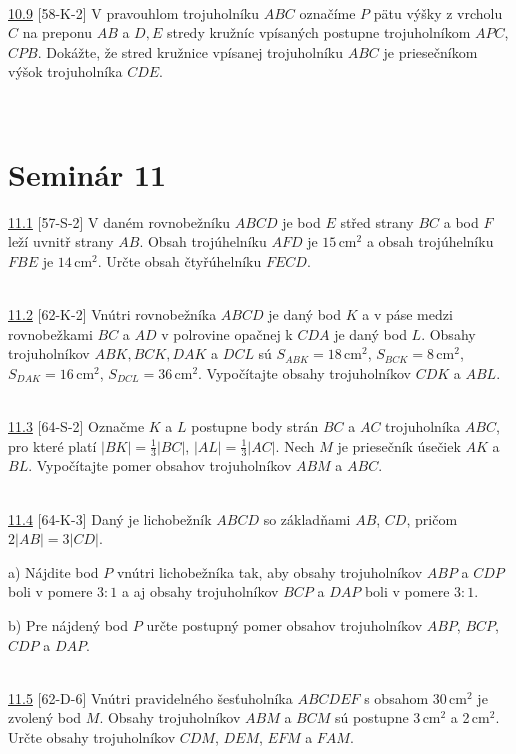\\

\noindent \ul{10.9} [58-K-2]
V pravouhlom trojuholníku $ABC$ označíme $P$ pätu výšky z vrcholu $C$ na preponu $AB$ a $D, E$ stredy kružníc vpísaných postupne trojuholníkom $APC$, $CPB$. Dokážte, že stred
kružnice vpísanej trojuholníku $ABC$ je priesečníkom výšok trojuholníka $CDE$.


\\

\section*{Seminár 11}

\noindent \ul{11.1} [57-S-2] V daném rovnobežníku $ABCD$ je bod $E$ střed strany $BC$ a bod $F$ leží
uvnitř strany $AB$. Obsah trojúhelníku $AFD$ je $15$\,cm$^2$ a obsah trojúhelníku $FBE$ je
$14$\,cm$^2$. Určte obsah čtyřúhelníku $FECD$.


\\

\noindent \ul{11.2} [62-K-2] Vnútri rovnobežníka $ABCD$ je daný bod $K$ a v páse medzi rovnobežkami $BC$ a $AD$ v polrovine opačnej k $CDA$ je daný bod $L$. Obsahy trojuholníkov $ABK, BCK, DAK$ a $DCL$ sú $S_{ABK} = 18$\,cm$^2$, $S_{BCK} = 8$\,cm$^2$, $S_{DAK} = 16$\,cm$^2$, $S_{DCL} = 36$\,cm$^2$. Vypočítajte obsahy trojuholníkov $CDK$ a $ABL$.


\\

\noindent \ul{11.3} [64-S-2] Označme $K$ a $L$ postupne body strán $BC$ a $AC$ trojuholníka $ABC$, pro které platí $|BK|= \frac{1}{3}|BC|$, $|AL| =\frac{1}{3}|AC|$. Nech $M$ je priesečník úsečiek $AK$ a $BL$. Vypočítajte pomer obsahov trojuholníkov $ABM$ a $ABC$.


\\

\noindent \ul{11.4} [64-K-3]  Daný je lichobežník $ABCD$ so základňami $AB$, $CD$, pričom $2|AB| = 3|CD|$.

a) Nájdite bod $P$ vnútri lichobežníka tak, aby obsahy trojuholníkov $ABP$ a $CDP$ boli v pomere $3 : 1$ a aj obsahy trojuholníkov $BCP$ a $DAP$ boli v pomere $3 : 1$.

b) Pre nájdený bod $P$ určte postupný pomer obsahov trojuholníkov $ABP$, $BCP$, $CDP$ a $DAP$.


\\

\noindent \ul{11.5} [62-D-6] Vnútri pravidelného šesťuholníka $ABCDEF$ s obsahom 30\,cm$^2$ je zvolený bod $M$. Obsahy trojuholníkov $ABM$ a $BCM$ sú postupne 3\,cm$^2$ a 2\,cm$^2$. Určte obsahy trojuholníkov $CDM$, $DEM$, $EFM$ a $FAM$.


